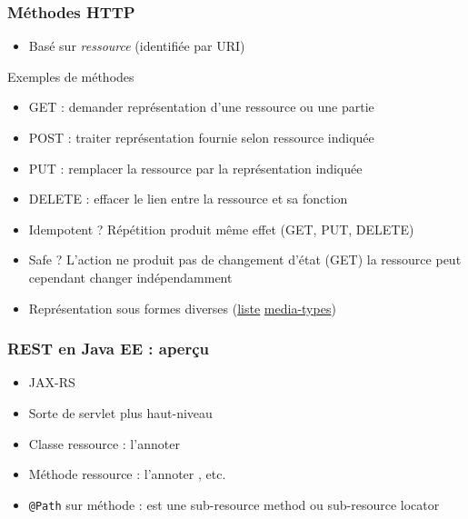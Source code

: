 \documentclass[english, french]{beamer}
\begin{document}
\begin{frame}
	\frametitle{Méthodes HTTP}
	\begin{itemize}
		\item Basé sur \emph{ressource} (identifiée par URI)
	\end{itemize}
	\begin{block}{Exemples de méthodes}
		\begin{itemize}
			\item GET : demander représentation d’une ressource {\tiny ou une partie}
			\item POST : traiter représentation fournie selon ressource indiquée
			\item PUT : remplacer la ressource par la représentation indiquée
			\item DELETE : effacer le lien entre la ressource et sa fonction
		\end{itemize}
	\end{block}
	\begin{itemize}
		\item Idempotent ? \pause Répétition produit même effet (GET, PUT, DELETE)
		\item Safe ? \pause L’action ne produit pas de changement d’état (GET) {\tiny la ressource peut cependant changer indépendamment}
		\item Représentation sous formes diverses (\href{http://www.iana.org/assignments/media-types/}{liste} \href{http://tools.ietf.org/html/rfc7231\#section-3.1.1.1}{media-types})
	\end{itemize}
\end{frame}

\begin{frame}
	\frametitle{REST en Java EE : aperçu}
	\begin{itemize}
		\item JAX-RS
		\item Sorte de servlet plus haut-niveau
		\item Classe ressource : l’annoter 
		\item Méthode ressource :  l’annoter , etc.
		\item \texttt{@Path} sur méthode : est une sub-resource method {\tiny ou sub-resource locator}
	\end{itemize}
\end{frame}
\end{document}
